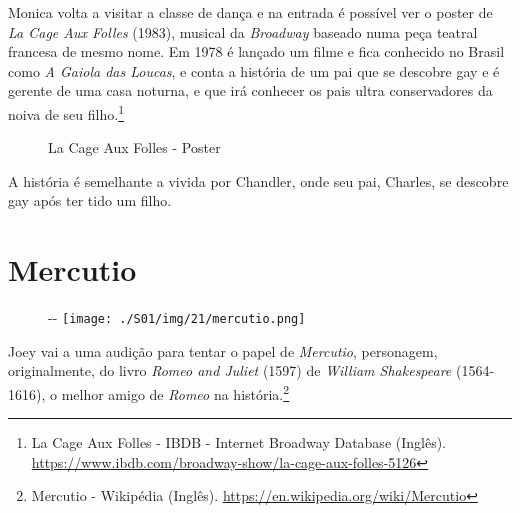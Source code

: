 \saveparinfos
\noindent
\begin{minipage}[c]{0.5\textwidth}\useparinfo

Monica volta a visitar a classe de dança e na entrada é possível ver o
poster de \emph{La Cage Aux Folles} (1983), musical da \emph{Broadway}
baseado numa peça teatral francesa de mesmo nome. Em 1978 é lançado um
filme e fica conhecido no Brasil como \emph{A Gaiola das Loucas}, e
conta a história de um pai que se descobre gay e é gerente de uma casa
noturna, e que irá conhecer os pais ultra conservadores da noiva de seu
filho.\footnote{\sloppy La Cage Aux Folles - IBDB - Internet Broadway Database (Inglês). \url{https://www.ibdb.com/broadway-show/la-cage-aux-folles-5126}}

\end{minipage}\hfill
\begin{minipage}[c]{0.45\textwidth}

\begin{figure}
  \centering
    \caption{La Cage Aux Folles - Poster\label{fig:la-cage-aux-folles-poster}}
\end{figure}

\end{minipage}

A história é semelhante a vivida por Chandler, onde seu pai, Charles, se
descobre gay após ter tido um filho.

\hypertarget{mercutio}{%
\section{Mercutio}\label{mercutio}}

\begin{figure}[!ht]
  \begin{adjustwidth}{-\oddsidemargin-1in}{-\rightmargin}
    \centering
    \texttt{[image: ./S01/img/21/mercutio.png]}
  \end{adjustwidth}
\end{figure}

Joey vai a uma audição para tentar o papel de \emph{Mercutio},
personagem, originalmente, do livro \emph{Romeo and Juliet} (1597) de
\emph{William Shakespeare} (1564-1616), o melhor amigo de \emph{Romeo}
na história.\footnote{\sloppy Mercutio - Wikipédia (Inglês). \url{https://en.wikipedia.org/wiki/Mercutio}}
